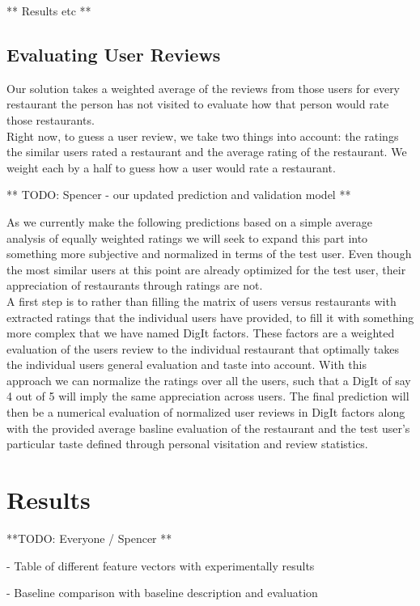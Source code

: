 \documentclass[10pt,twocolumn,letterpaper]{article}
\begin{document}
** Results etc **

\subsection{Evaluating User Reviews}
Our solution takes a weighted average of the reviews from those users for every restaurant the person has not visited to evaluate how that person would rate those restaurants.
\\[0.5em]
\indent Right now, to guess a user review, we take two things into account: the ratings the similar users rated a restaurant and the average rating of the restaurant. We weight each by a half to guess how a user would rate a restaurant.

** TODO: Spencer - our updated prediction and validation model **

As we currently make the following predictions based on a simple average analysis of equally weighted ratings we will seek to expand this part into something more subjective and normalized in terms of the test user. Even though the most similar users at this point are already optimized for the test user, their appreciation of restaurants through ratings are not. \\[.5em]
\indent A first step is to rather than filling the matrix of users versus restaurants with extracted ratings that the individual users have provided, to fill it with something more complex that we have named DigIt factors. These factors are a weighted evaluation of the users review to the individual restaurant that optimally takes the individual users general evaluation and taste into account. With this approach we can normalize the ratings over all the users, such that a DigIt of say 4 out of 5 will imply the same appreciation across users. The final prediction will then be a numerical evaluation of normalized user reviews in DigIt factors along with the provided average basline evaluation of the restaurant and the test user's particular taste defined through personal visitation and review statistics.

\section{Results}
**TODO: Everyone / Spencer **

- Table of different feature vectors with experimentally results

- Baseline comparison with baseline description and evaluation
\end{document}
